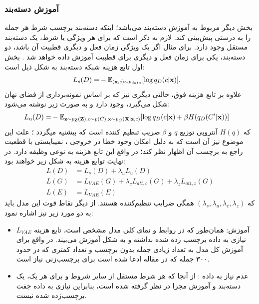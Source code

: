 \subsubsection*{آموزش دسته‌بند}
بخش دیگر مربوط به آموزش دسته‌بند می‌باشد؛ اینکه دسته‌بند برچسب شرط هر جمله را به درستی پیش‌بینی کند. لازم به ذکر است که برای هر ویژگی یا شرط، یک دسته‌بند مستقل وجود دارد. برای مثال اگر یک ویژگی زمان فعل و دیگری قطبیت آن باشد، دو دسته‌بند، یکی برای زمان فعل و دیگری برای قطبیت آموزش داده خواهد شد \cite{toward}. بخش اول تابع هزینه شبکه دسته‌بند به شکل ذیل است:
\begin{equation}
	\begin{split}
		L_{s} (D) =& -\mathbb E_{({\bf x},c) \sim p_{data}} [\log q_D(c|{\bf x})].
	\end{split}
\end{equation}
علاوه بر تابع هزینه فوق، حالتی دیگری نیز که بر اساس نمونه‌برداری از فضای نهان شکل می‌گیرد، وجود دارد و به صورت زیر نوشته می‌شود:
\begin{equation}
	\begin{split}
		L_{u} (D) =& -\mathbb E_{{\bf z} \sim p_{\bf Z}({\bf Z}), c \sim p(C), {\bf x} \sim p_G({\bf X}|{\bf z},c)} [\log q_D(c|{\bf x}) + \beta H(q_D(C'|{\bf x}))]
	\end{split}
\end{equation}
که $H(q)$ آنتروپی توزیع $q$ و $\beta$ ضریب تنظیم کننده است که بیشنیه میگردد \cite{toward}؛ علت این موضوع نیز آن است که به دلیل امکان وجود خطا در خروجی \decoder{}، \classifier{} نمیبایستی با قطعیت راجع به برچسب آن اظهار نظر کند؛ در واقع این تابع هزینه به نوعی وظیفه \augmentation{} دارد.
در نهایت توابع هزینه به شکل زیر خواهند بود:
\begin{equation}
	\begin{split}
		L (D) &= L_{s} (D) + \lambda_u L_{u} (D)\\
		L (G) &= L_{VAE} (G) + \lambda_c L_{att, c} (G) + \lambda_z L_{att, z} (G)\\
		L (E) &= L_{VAE} (E)
	\end{split}
\end{equation}
که $(\lambda_s, \lambda_u, \lambda_c , \lambda_z)$ همگی ضرایب تنظیم‌کننده هستند. از دیگر نقاط قوت این مدل باید به دو مورد زیر نیز اشاره نمود:
\renewcommand{\labelitemi}{$\bullet$}
\begin{itemize}
	\item

	      آموزش:
	      همان‌طور که در روابط و نمای کلی مدل مشخص است، تابع هزینه $L_{VAE}$ نیازی به داده برچسب زده شده نداشته و به شکل \semisupervised{} آموزش می‌بیند. در واقع برای آموزش کل مدل به تعداد زیادی جمله بدون برچسب و تعداد کمتری که در حدود ۳۰۰ جمله که در مقاله ادعا شده است برای برچسب‌زنی نیاز است.
	\item
	      عدم نیاز به داده :
	      از آنجا که هر شرط مستقل از سایر شروط و برای هر یک، یک دسته‌بند و آموزش مجزا در نظر گرفته شده است، بنابراین نیازی به داده جفت برچسب‌زده شده نیست.
\end{itemize}

